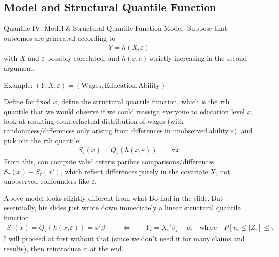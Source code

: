 \documentclass[aspectratio=169, handout]{beamer}
\begin{document}
\subsection{Model and Structural Quantile Function}

{\scriptsize
\begin{frame}{Quantile IV: Model \& Structural Quantile Function}
\alert{Model}:
Suppose that outcomes are generated according to
\begin{align*}
  Y = h(X,\varepsilon)
\end{align*}
with $X$ and $\varepsilon$ possibly correlated, and $h(x,e)$ strictly
increasing in the second argument.

\vspace{-5pt}

Example:
$(Y,X,\varepsilon)=(\text{Wages}, \text{Education},\text{Ability})$

\vspace{-5pt}
Define for fixed $x$, define the
\alert{structural quantile function}, which
is the $\tau$th quantile that we \alert{would observe} if we could
\alert{reassign everyone} to education level $x$, look at resulting
\alert{counterfactual} distribution of wages (with
randomness/differences only arising from differences in unobserved
ability $\varepsilon$), and pick out the $\tau$th quantile:
\begin{align*}
  S_\tau(x) = Q_\tau(h(x,\varepsilon))
  \qquad
  \forall x
\end{align*}
From this, can compute valid ceteris paribus comparisons/differences,
$S_\tau(x)-S_\tau(x')$,
which reflect differences purely in the covariate $X$, not unobserved
confounders like $\varepsilon$.

\vspace{-5pt}
Above model looks slightly different from what Bo had in the slide.
But essentially, his slides just wrote down immediately a \alert{linear}
structural quantile function
\begin{align*}
  S_\tau(x)
  = Q_\tau(h(x,\varepsilon))
  = x'\beta_\tau
  \qquad \iff\qquad
  Y_i = X_i'\beta_\tau + u_i
  \quad\text{where}\quad
  P[u_i\leq |Z_i]\leq \tau
\end{align*}
I will proceed at first without that (since we don't need it for many
claims and results), then reintroduce it at the end.
\end{frame}
}
\end{document}
